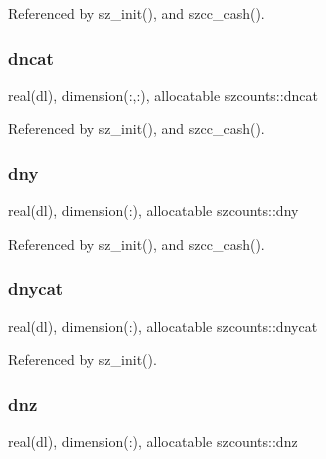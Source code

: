 Referenced by sz\+\_\+init(), and szcc\+\_\+cash().

\mbox{\label{namespaceszcounts_a97eccbe43cd988a15f416908d5032a54}} 
\subsubsection{\texorpdfstring{dncat}{dncat}}
{\footnotesize\ttfamily real(dl), dimension(\+:,\+:), allocatable szcounts\+::dncat\hspace{0.3cm}{\ttfamily [private]}}



Referenced by sz\+\_\+init(), and szcc\+\_\+cash().

\mbox{\label{namespaceszcounts_aed7311f56ea05af971cdd62ed4d8ff1c}} 
\subsubsection{\texorpdfstring{dny}{dny}}
{\footnotesize\ttfamily real(dl), dimension(\+:), allocatable szcounts\+::dny\hspace{0.3cm}{\ttfamily [private]}}



Referenced by sz\+\_\+init(), and szcc\+\_\+cash().

\mbox{\label{namespaceszcounts_ad8ce700b221def6cc6adfbbac449cdec}} 
\subsubsection{\texorpdfstring{dnycat}{dnycat}}
{\footnotesize\ttfamily real(dl), dimension(\+:), allocatable szcounts\+::dnycat\hspace{0.3cm}{\ttfamily [private]}}



Referenced by sz\+\_\+init().

\mbox{\label{namespaceszcounts_aa90e9286036783e86cde085a3266838c}} 
\subsubsection{\texorpdfstring{dnz}{dnz}}
{\footnotesize\ttfamily real(dl), dimension(\+:), allocatable szcounts\+::dnz\hspace{0.3cm}{\ttfamily [private]}}



